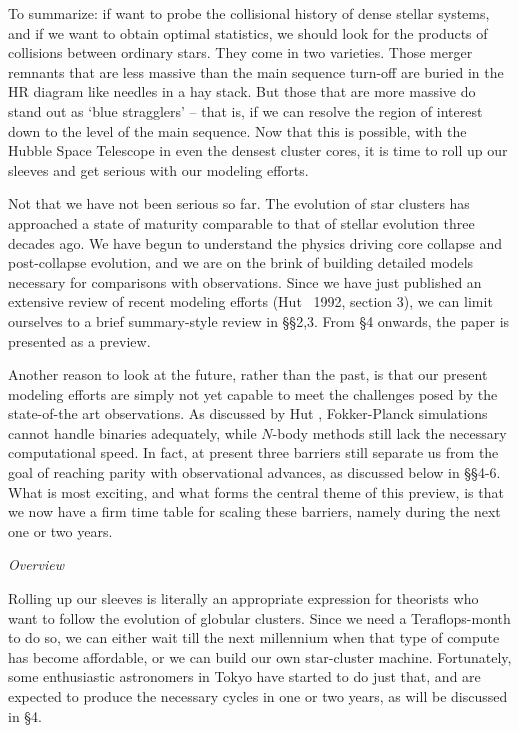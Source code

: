 To summarize: if want to probe the collisional history of dense
stellar systems, and if we want to obtain optimal statistics, we
should look for the products of collisions between ordinary stars.
They come in two varieties.  Those merger remnants that are less
massive than the main sequence turn-off are buried in the HR diagram
like needles in a hay stack.  But those that are more massive do stand
out as `blue stragglers' -- that is, if we can resolve the region of
interest down to the level of the main sequence.  Now that this is
possible, with the Hubble Space Telescope in even the densest cluster
cores, it is time to roll up our sleeves and get serious with our
modeling efforts.

Not that we have not been serious so far.  The evolution of star
clusters has approached a state of maturity comparable to that of
stellar evolution three decades ago.  We have begun to understand the
physics driving core collapse and post-collapse evolution, and we are
on the brink of building detailed models necessary for comparisons
with observations.  Since we have just published an extensive review
of recent modeling efforts (Hut \etal\ 1992, section 3), we can limit
ourselves to a brief summary-style review in \S\S2,3.  From \S4
onwards, the paper is presented as a preview.

Another reason to look at the future, rather than the past, is that
our present modeling efforts are simply not yet capable to meet the
challenges posed by the state-of-the art observations.  As discussed
by Hut \etal, Fokker-Planck simulations cannot handle binaries
adequately, while $N$-body methods still lack the necessary
computational speed.  In fact, at present three barriers still
separate us from the goal of reaching parity with observational
advances, as discussed below in \S\S 4-6.  What is most exciting, and
what forms the central theme of this preview, is that we now have a
firm time table for scaling these barriers, namely during the next one
or two years.

\bigskip
\noindent
{\it Overview}
\medskip

Rolling up our sleeves is literally an appropriate expression for
theorists who want to follow the evolution of globular clusters.
Since we need a Teraflops-month to do so, we can either wait till the
next millennium when that type of compute has become affordable, or we
can build our own star-cluster machine.  Fortunately, some
enthusiastic astronomers in Tokyo have started to do just that, and are
expected to produce the necessary cycles in one or two years, as will
be discussed in \S 4.

